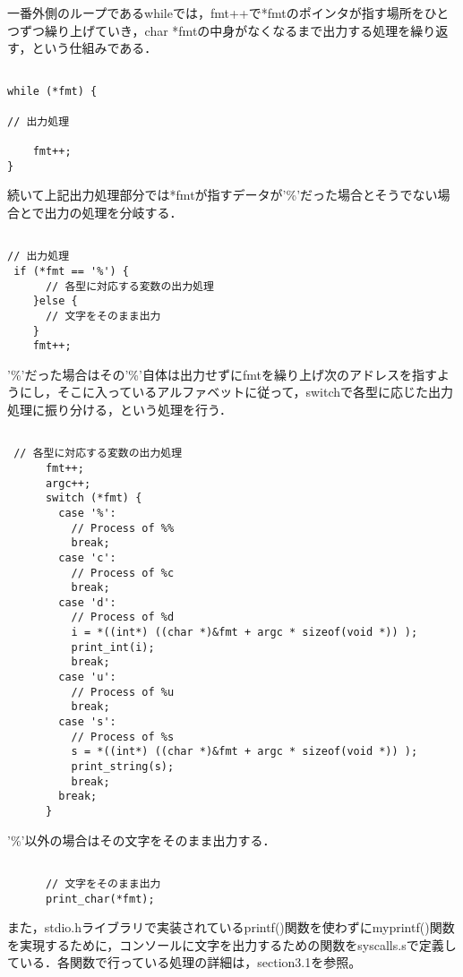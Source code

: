 \documentclass[a4j]{jarticle}
\begin{document}
一番外側のループであるwhileでは，fmt++で*fmtのポインタが指す場所をひとつずつ繰り上げていき，char *fmtの中身がなくなるまで出力する処理を繰り返す，という仕組みである．

{\baselineskip 3mm
  \begin{verbatim}

while (*fmt) {

// 出力処理

    fmt++;
}

\end{verbatim}
}

続いて上記出力処理部分では*fmtが指すデータが'\%'だった場合とそうでない場合とで出力の処理を分岐する．

{\baselineskip 3mm
  \begin{verbatim}

// 出力処理
 if (*fmt == '%') {
      // 各型に対応する変数の出力処理
    }else {
      // 文字をそのまま出力
    }
    fmt++;

\end{verbatim}
}

'\%'だった場合はその'\%'自体は出力せずにfmtを繰り上げ次のアドレスを指すようにし，そこに入っているアルファベットに従って，switchで各型に応じた出力処理に振り分ける，という処理を行う．

{\baselineskip 3mm
  \begin{verbatim}

 // 各型に対応する変数の出力処理
      fmt++;
      argc++;
      switch (*fmt) {
        case '%':
          // Process of %%
          break;
        case 'c':
          // Process of %c
          break;
        case 'd':
          // Process of %d
          i = *((int*) ((char *)&fmt + argc * sizeof(void *)) );
          print_int(i);
          break;
        case 'u':
          // Process of %u
          break;
        case 's':
          // Process of %s
          s = *((int*) ((char *)&fmt + argc * sizeof(void *)) );
          print_string(s);
          break;
        break;
      }

\end{verbatim}
}

'\%'以外の場合はその文字をそのまま出力する．

{\baselineskip 3mm
  \begin{verbatim}

      // 文字をそのまま出力 
      print_char(*fmt);

\end{verbatim}
}


また，stdio.hライブラリで実装されているprintf()関数を使わずにmyprintf()関数を実現するために，コンソールに文字を出力するための関数をsyscalls.sで定義している．各関数で行っている処理の詳細は，section3.1を参照。 
\end{document}
